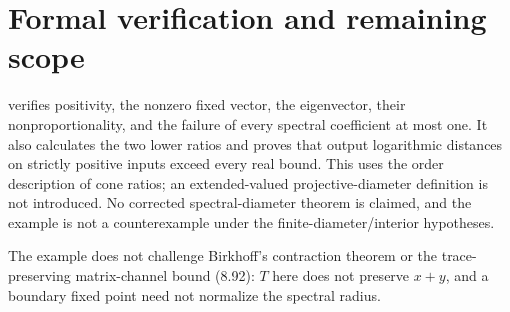 \documentclass{article}
\begin{document}
\section{Formal verification and remaining scope}
 verifies positivity,
the nonzero fixed vector, the eigenvector, their nonproportionality, and the
failure of every spectral coefficient at most one. It also calculates the
two lower ratios and proves that output logarithmic distances on strictly
positive inputs exceed every real bound. This uses the order description
of cone ratios; an extended-valued projective-diameter definition is not
introduced. No corrected spectral-diameter theorem is claimed, and the example is not
a counterexample under the finite-diameter/interior hypotheses.

The example does not challenge Birkhoff's contraction theorem or the
trace-preserving matrix-channel bound (8.92): $T$ here does not preserve
$x+y$, and a boundary fixed point need not normalize the spectral radius.



\end{document}

